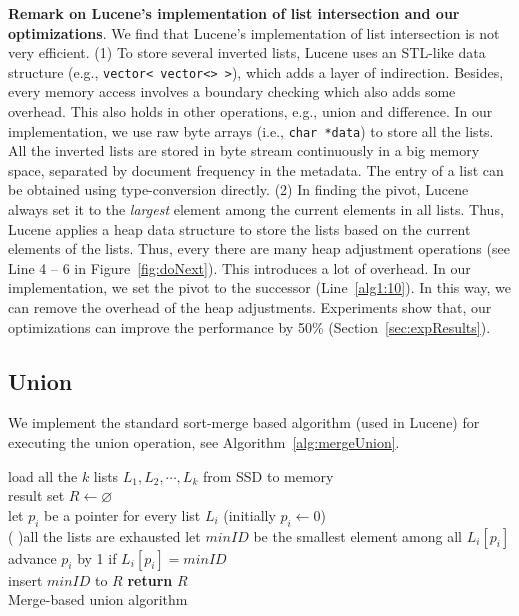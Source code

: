 \textbf{Remark on Lucene's implementation of list intersection and our optimizations}. We find that Lucene's implementation of list intersection is not very efficient. (1) To store several inverted lists, Lucene uses an STL-like data structure (e.g., \texttt{vector< vector<> >}), which adds a layer of indirection. Besides, every memory access involves a boundary checking which also adds some overhead. This also holds in other operations, e.g., union and difference. In our implementation, we use raw byte arrays (i.e., \texttt{char *data}) to store all the lists. All the inverted lists are stored in byte stream continuously in a big memory space, separated by document frequency in the metadata. The entry of a list can be obtained using type-conversion directly. (2) In finding the pivot, Lucene always set it to the \emph{largest} element among the current elements in all lists. Thus, Lucene applies a heap data structure to store the lists based on the current elements of the lists. Thus, every there are many heap adjustment operations (see Line 4 -- 6 in Figure~\ref{fig:doNext}). This introduces a lot of overhead. In our implementation, we set the pivot to the successor (Line~\ref{alg1:10}). In this way, we can remove the overhead of the heap adjustments. Experiments show that, our optimizations can improve the performance by 50\% (Section~\ref{sec:expResults}).

\subsection{Union}\label{sec:union}
We implement the standard sort-merge based algorithm (used in Lucene) for executing the union operation, see Algorithm~\ref{alg:mergeUnion}.

 \begin{algorithm}[htbp]\small

load all the $k$ lists $L_1, L_2, \cdots, L_k$ from SSD to memory\\
result set $R \leftarrow \varnothing$\\
let $p_i$ be a pointer for every list $L_i$ (initially $p_i \leftarrow 0$)\\
\Repeat( ){all the lists are exhausted}{
 let $minID$ be the smallest element among all $L_i[p_i]$\\
 advance $p_i$ by 1 if $L_i[p_i] = minID$\\
 insert $minID$ to $R$
 }
 \textbf{return} $R$\\
 \caption{Merge-based union algorithm}\label{alg:mergeUnion}
 \end{algorithm}

